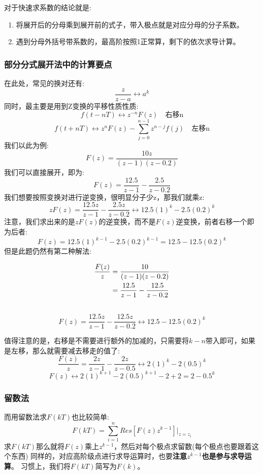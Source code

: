 \documentclass[12pt, a4paper, oneside]{ctexbook}
\begin{document}
对于快速求系数的结论就是:
\begin{enumerate} 
	\item 将展开后的分母乘到展开前的式子，带入极点就是对应分母的分子系数。
	\item 遇到分母外括号带系数的，最高阶按照1正常算，剩下的依次求导计算。
\end{enumerate}

\subsubsection{部分分式展开法中的计算要点}

\noindent 在此处，常见的换对还有:
$$\frac{z}{z-a}\leftrightarrow a^k$$
同时，最主要是用到Z变换的平移性质性质:
$$
f(t-nT) \leftrightarrow z^{-n}F(z) \quad \mbox{右移n}
$$
$$
f(t+nT) \leftrightarrow z^{n}F(z) - \sum_{j=0}^{n-1}z^{n-j}f(j) \quad \mbox{左移n}
$$
我们以此为例:
$$
F(z)=\frac{10z}{(z-1)(z-0.2)}
$$
我们可以直接展开，即为:
$$
F(z)=\frac{12.5}{z-1}-\frac{2.5}{z-0.2}
$$
我们想要按照变换对进行逆变换，很明显分子少z，那我们就乘z:
$$
zF(z)=\frac{12.5z}{z-1}-\frac{2.5z}{z-0.2}\leftrightarrow12.5(1)^k-2.5(0.2)^k
$$
注意，我们求出来的是$zF(z)$的逆变换，而不是$F(z)$逆变换，前者右移一个即为后者:
$$
F(z)=12.5(1)^{k-1}-2.5(0.2)^{k-1}=12.5-12.5(0.2)^k
$$
但是此题仍然有第二种解法:


\begin{equation}
	\begin{aligned}
	\frac{F(z)}{z}&=\frac{10}{(z-1)(z-0.2)}\\ \notag
	&=\frac{12.5}{z-1}-\frac{12.5}{z-0.2}\\ \notag
	\end{aligned}
\end{equation}
$$
F(z)=\frac{12.5z}{z-1}-\frac{12.5z}{z-0.2}\leftrightarrow 12.5-12.5(0.2)^k
$$

值得注意的是，右移是不需要进行额外的加减的，只需要将$k-n$带入即可，如果是左移，那么就需要减去移走的值了:
$$
\frac{F(z)}{z}=\frac{2z}{z-1}-\frac{2z}{z-0.5}\leftrightarrow2(1)^k-2(0.5)^k
$$
$$
F(z)\leftrightarrow2(1)^{k+1}-2(0.5)^{k+1}-2+2=2-0.5^k
$$
\subsubsection{留数法}

\noindent 而用留数法求$F(kT)$也比较简单:
$$
F(kT)=\sum_{i=1}^nRes[F(z)z^{k-1}]\bigg|_{z=z_i}
$$
求$F(kT)$那么就将$F(z)$乘上$z^{k-1}$，然后对每个极点求留数(每个极点也要跟着这个东西)
同样的，对应高阶级点进行求导运算时，也要\textbf{注意$z^{k-1}$也是参与求导运算}。
习惯上，我们将$F(kT)$简写为$F(k)$。
\end{document}

